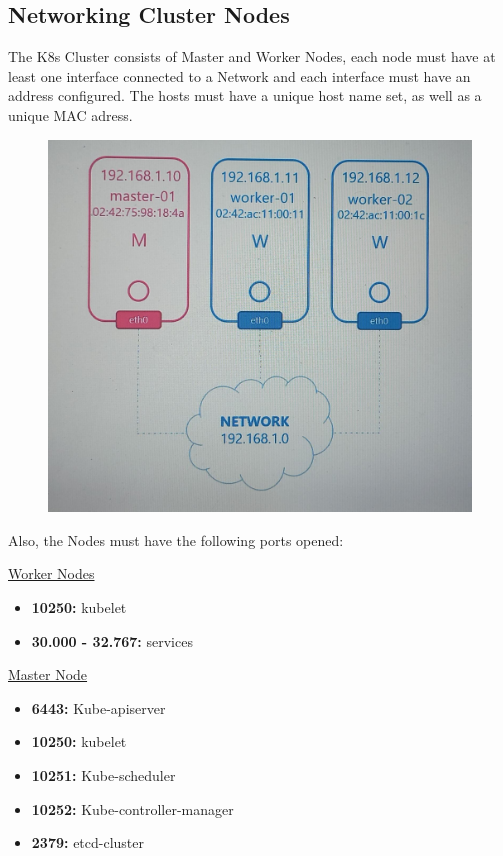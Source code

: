 \documentclass{article}
\begin{document}
\subsection{Networking Cluster Nodes}

The K8s Cluster consists of Master and Worker Nodes, each node must have at least one interface connected to a Network and each interface must have an address configured. The hosts must have a unique host name set, as well as a unique MAC adress.

\begin{figure}[H]
    \centering
    \includegraphics[scale=0.2]{pictures/locura1.png}
\end{figure}

Also, the Nodes must have the following ports opened:

\underline{Worker Nodes}
\begin{itemize}
    \item \textbf{10250:} kubelet
    \item \textbf{30.000 - 32.767:} services
\end{itemize}

\underline{Master Node}
\begin{itemize}
    \item \textbf{6443:} Kube-apiserver
    \item \textbf{10250:} kubelet
    \item \textbf{10251:} Kube-scheduler
    \item \textbf{10252:} Kube-controller-manager
    \item \textbf{2379:} etcd-cluster
\end{itemize}
\end{document}
